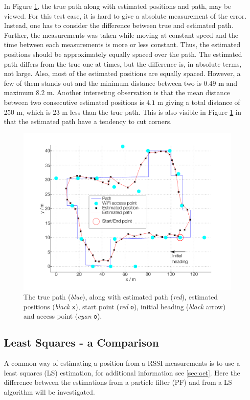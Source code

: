 \documentclass{LTHthesis}
\begin{document}
In Figure \ref{true_vs_est_env_3}, the true path along with estimated positions and path, may be viewed. For this test case, it is hard to give a absolute measurement of the error. Instead, one has to consider the difference between true and estimated path. Further, the measurements was taken while moving at constant speed and the time between each measurements is more or less constant. Thus, the estimated positions should be approximately equally spaced over the path. The estimated path differs from the true one at times, but the difference is, in absolute terms, not large. Also, most of the estimated positions are equally spaced. However, a few of them stands out and the minimum distance between two is $0.49$ m and maximum $8.2$ m. Another interesting observation is that the mean distance between two consecutive estimated positions is $4.1$ m giving a total distance of $250$ m, which is $23$ m less than the true path. This is also visible in Figure \ref{true_vs_est_env_3} in that the estimated path have a tendency to cut corners.         
%
\begin{figure}[!hbt]

\includegraphics[width=1\textwidth ]{images/pure_rssi/true_vs_est_env_3}
\caption{The true path (\emph{blue}), along with estimated path (\emph{red}), estimated positions (\emph{black} \texttt{x}), start point (\emph{red} \texttt{o}), initial heading (\emph{black} arrow) and access point (\emph{cyan} \texttt{o}).}\label{true_vs_est_env_3}
\end{figure}
%
\subsection{Least Squares - a Comparison}
%
A common way of estimating a position from a RSSI measurements is to use a least squares (LS) estimation, for additional information see \ref{sec:oet}. Here the difference between the estimations from a particle filter (PF) and from a LS algorithm will be investigated. 
\end{document}

